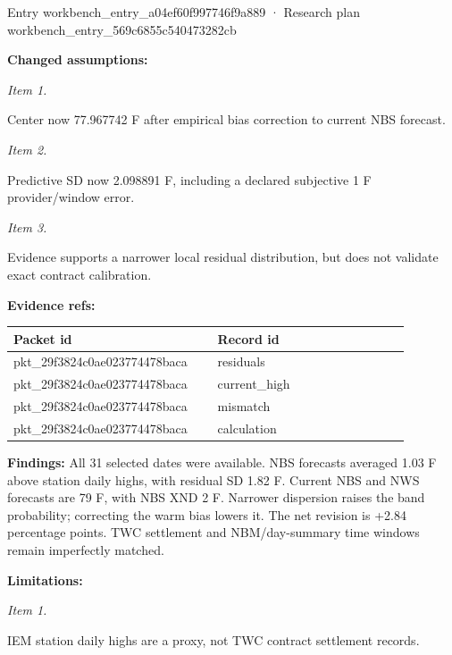 \documentclass[11pt]{article}
\begin{document}
Entry workbench\_en\hspace{0pt}try\_a04ef60f\hspace{0pt}997746f9a889 · Research plan workbench\_en\hspace{0pt}try\_569c6855\hspace{0pt}c540473282cb


\par\noindent\textbf{Changed assumptions:} \par \par\noindent\textit{Item 1.}\par Center now 77.967742 F after empirical bias correction to current NBS forecast.

\par\noindent\textit{Item 2.}\par Predictive SD now 2.098891 F, including a declared subjective 1 F provider/window error.

\par\noindent\textit{Item 3.}\par Evidence supports a narrower local residual distribution, but does not validate exact contract calibration.

\par\noindent\textbf{Evidence refs:} \par \begin{longtable}{>{\raggedright\arraybackslash}p{0.440\linewidth}>{\raggedright\arraybackslash}p{0.440\linewidth}}
Packet id & Record id \\ \hline\endhead
pkt\_29f3824c0ae023774478baca & residuals \\
pkt\_29f3824c0ae023774478baca & current\_high \\
pkt\_29f3824c0ae023774478baca & mismatch \\
pkt\_29f3824c0ae023774478baca & calculation \\
\end{longtable}

\par\noindent\textbf{Findings:} All 31 selected dates were available. NBS forecasts averaged 1.03 F above station daily highs, with residual SD 1.82 F. Current NBS and NWS forecasts are 79 F, with NBS XND 2 F. Narrower dispersion raises the band probability; correcting the warm bias lowers it. The net revision is +2.84 percentage points. TWC settlement and NBM/day-summary time windows remain imperfectly matched.

\par\noindent\textbf{Limitations:} \par \par\noindent\textit{Item 1.}\par IEM station daily highs are a proxy, not TWC contract settlement records.
\end{document}
